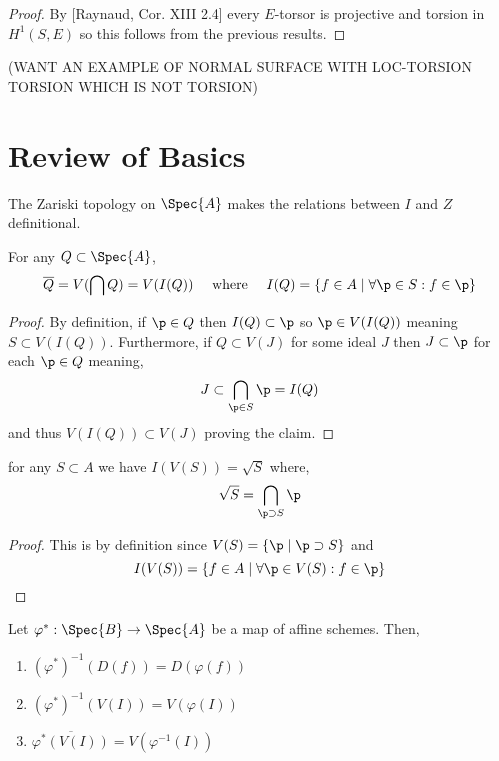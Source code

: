 \documentclass[12pt]{article}
\begin{document}
\begin{proof}
By [Raynaud, Cor. XIII 2.4] every $E$-torsor is projective and torsion in $H^1(S, E)$ so this follows from the previous results.  
\end{proof}

(WANT AN EXAMPLE OF NORMAL SURFACE WITH LOC-TORSION TORSION WHICH IS NOT TORSION)

\section{Review of Basics}

\begin{rmk}
The Zariski topology on $\Spec{A}$ makes the relations between $I$ and $Z$ definitional. 
\end{rmk}

\begin{prop}
For any $Q \subset \Spec{A}$,
\[ \overline{Q} = V(\bigcap Q) = V(I(Q)) \quad \text{ where } \quad I(Q) = \{ f \in A \mid \forall \p \in S : f \in \p \} \]
\end{prop}

\begin{proof}
By definition, if $\p \in Q$ then $I(Q) \subset \p$ so $\p \in V(I(Q))$ meaning $S \subset V(I(Q))$. Furthermore, if $Q \subset V(J)$ for some ideal $J$ then $J \subset \p$ for each $\p \in Q$ meaning,
\[ J \subset \bigcap_{\p \in S} \p = I(Q) \]
and thus $V(I(Q)) \subset V(J)$ proving the claim.
\end{proof}

\begin{prop}
for any $S \subset A$ we have $I(V(S)) = \sqrt{S}$ where,
\[ \sqrt{S} = \bigcap_{\p \supset S} \p \]
\end{prop}

\begin{proof}
This is by definition since $V(S) = \{ \p \mid \p \supset S \}$ and 
\[ I(V(S)) = \{ f \in A \mid \forall \p \in V(S) : f \in \p \} \]
\end{proof}

\begin{prop}
Let $\varphi^* : \Spec{B} \to \Spec{A}$ be a map of affine schemes. Then,
\begin{enumerate}
\item $(\varphi^*)^{-1}(D(f)) = D(\varphi(f))$
\item $(\varphi^*)^{-1}(V(I)) = V(\varphi(I))$
\item $\overline{\varphi^*(V(I))} = V(\varphi^{-1}(I))$
\end{enumerate}
\end{prop}
\end{document}
